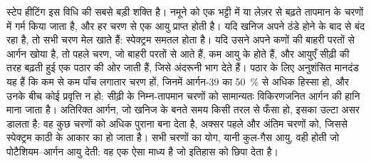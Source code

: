 स्टेप हीटिंग इस विधि की सबसे बड़ी शक्ति है। नमूने को एक भट्टी में
या लेज़र से बढ़ते तापमान के चरणों में गर्म किया जाता है, और हर चरण से एक आयु प्राप्त होती है।
यदि खनिज अपने ठंडे होने के बाद से बंद रहा है, तो सभी चरण मेल खाते हैं: स्पेक्ट्रम
समतल होता है। यदि उसने अपने कणों की बाहरी परतों से आर्गन खोया है, तो पहले चरण,
जो बाहरी परतों से आते हैं, कम आयु के होते हैं, और आयुएँ सीढ़ी की तरह बढ़ती हुई एक
पठार की ओर जाती हैं, जिसे अंदरूनी भाग देते हैं। पठार के लिए अनुशंसित मानदंड यह हैं कि
कम से कम पाँच लगातार चरण हों, जिनमें आर्गन-39 का \qty{50}{\percent} से अधिक हिस्सा हो,
और उनके बीच कोई प्रवृत्ति न हो; सीढ़ी के निम्न-तापमान चरणों को सामान्यतः
विकिरणजनित आर्गन की हानि माना जाता है। अतिरिक्त आर्गन, जो खनिज के बनते समय किसी तरल से फँसा हो,
इसका उल्टा असर डालता है: वह कुछ चरणों को अधिक पुराना बना देता है, अक्सर पहले
और अंतिम चरणों को, जिससे स्पेक्ट्रम काठी के आकार का हो जाता है। सभी चरणों का योग, यानी कुल-गैस आयु,
वही होती जो पोटैशियम--आर्गन आयु देती: वह एक ऐसा माध्य है
जो इतिहास को छिपा देता है।

